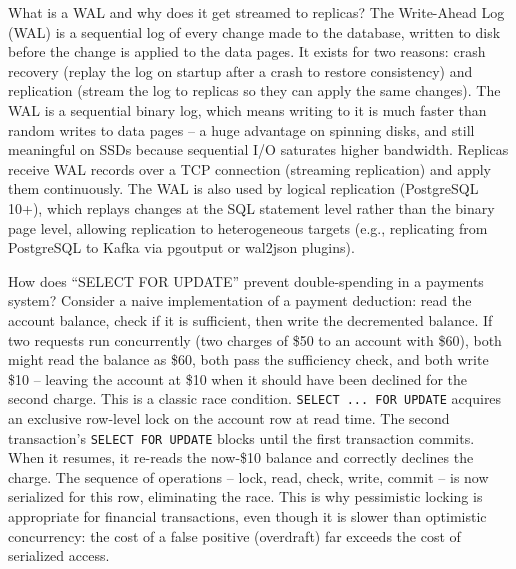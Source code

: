 \documentclass[11pt,a4paper]{article}
\begin{document}
\begin{curiobox}{What is a WAL and why does it get streamed to replicas?}
The Write-Ahead Log (WAL) is a sequential log of every change made to the database, written to disk before the change is applied to the data pages. It exists for two reasons: crash recovery (replay the log on startup after a crash to restore consistency) and replication (stream the log to replicas so they can apply the same changes). The WAL is a sequential binary log, which means writing to it is much faster than random writes to data pages -- a huge advantage on spinning disks, and still meaningful on SSDs because sequential I/O saturates higher bandwidth. Replicas receive WAL records over a TCP connection (streaming replication) and apply them continuously. The WAL is also used by logical replication (PostgreSQL 10+), which replays changes at the SQL statement level rather than the binary page level, allowing replication to heterogeneous targets (e.g., replicating from PostgreSQL to Kafka via pgoutput or wal2json plugins).
\end{curiobox}

\begin{curiobox}{How does ``SELECT FOR UPDATE'' prevent double-spending in a payments system?}
Consider a naive implementation of a payment deduction: read the account balance, check if it is sufficient, then write the decremented balance. If two requests run concurrently (two charges of \$50 to an account with \$60), both might read the balance as \$60, both pass the sufficiency check, and both write \$10 -- leaving the account at \$10 when it should have been declined for the second charge. This is a classic race condition. \texttt{SELECT ... FOR UPDATE} acquires an exclusive row-level lock on the account row at read time. The second transaction's \texttt{SELECT FOR UPDATE} blocks until the first transaction commits. When it resumes, it re-reads the now-\$10 balance and correctly declines the charge. The sequence of operations -- lock, read, check, write, commit -- is now serialized for this row, eliminating the race. This is why pessimistic locking is appropriate for financial transactions, even though it is slower than optimistic concurrency: the cost of a false positive (overdraft) far exceeds the cost of serialized access.
\end{curiobox}
\end{document}
